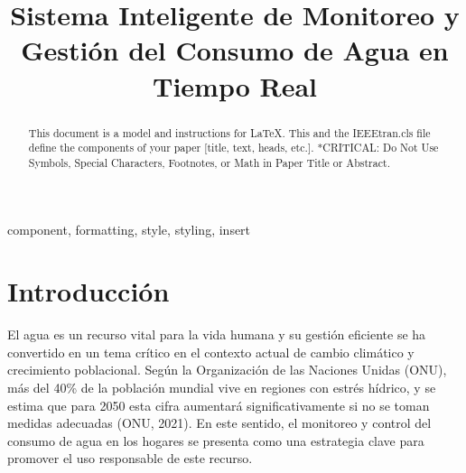 \documentclass[conference]{IEEEtran}
\begin{document}
\title{Sistema Inteligente de Monitoreo y Gestión del Consumo de Agua en Tiempo Real}

\author{
    \and
    \and
}

\maketitle

\begin{abstract}
    This document is a model and instructions for \LaTeX.
    This and the IEEEtran.cls file define the components of your paper [title, text, heads, etc.]. *CRITICAL: Do Not Use Symbols, Special Characters, Footnotes,
    or Math in Paper Title or Abstract.
\end{abstract}

\begin{IEEEkeywords}
    component, formatting, style, styling, insert
\end{IEEEkeywords}

\section{Introducción}
El agua es un recurso vital para la vida humana y su gestión eficiente se ha
convertido en un tema crítico en el contexto actual de cambio climático y
crecimiento poblacional. Según la Organización de las Naciones Unidas (ONU),
más del 40\% de la población mundial vive en regiones con estrés hídrico, y se
estima que para 2050 esta cifra aumentará significativamente si no se toman
medidas adecuadas (ONU, 2021). En este sentido, el monitoreo y control del
consumo de agua en los hogares se presenta como una estrategia clave para
promover el uso responsable de este recurso.
\end{document}
